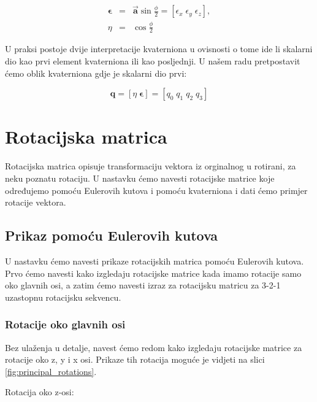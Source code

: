 \documentclass[times, utf8, diplomski, numeric]{templates/template}
\begin{document}
{{        \begin{equation}
        \label{eq:kvaternion}
        \begin{array}{rcl}
            \boldsymbol\epsilon &  = & \overrightarrow{\textbf{a}}\sin\frac{\phi}{2} = \left[\epsilon_{x} \; \epsilon_{y} \; \epsilon_{z} \right], \\
            \eta & = & \cos\frac{\phi}{2}
        \end{array}
        \end{equation}

        U praksi postoje dvije interpretacije kvaterniona u ovisnosti o tome ide li skalarni dio kao prvi element kvaterniona ili kao posljednji. U našem radu pretpostavit ćemo oblik kvaterniona gdje je skalarni dio prvi:

        \begin{equation}
            \textbf{q}=
            \left[\eta \; \boldsymbol\epsilon \right] = \left[q_{0} \; q_{1} \; q_{2} \; q_{3}\right]
        \end{equation}
    }

    \section{Rotacijska matrica}{
        Rotacijska matrica opisuje transformaciju vektora iz orginalnog u rotirani, za neku poznatu rotaciju. U nastavku ćemo navesti rotacijske matrice koje određujemo pomoću Eulerovih kutova i pomoću kvaterniona i dati ćemo primjer rotacije vektora.

        \subsection{Prikaz pomoću Eulerovih kutova}{
            U nastavku ćemo navesti prikaze rotacijskih matrica pomoću Eulerovih kutova. Prvo ćemo navesti kako izgledaju rotacijske matrice kada imamo rotacije samo oko glavnih osi, a zatim ćemo navesti izraz za rotacijsku matricu za 3-2-1 uzastopnu rotacijsku sekvencu.

            \subsubsection{Rotacije oko glavnih osi}{
                Bez ulaženja u detalje, navest ćemo redom kako izgledaju rotacijske matrice za rotacije oko z, y i x osi. Prikaze tih rotacija moguće je vidjeti na slici \ref{fig:principal_rotations}.

                Rotacija oko z-osi:

}}}}
\end{document}
